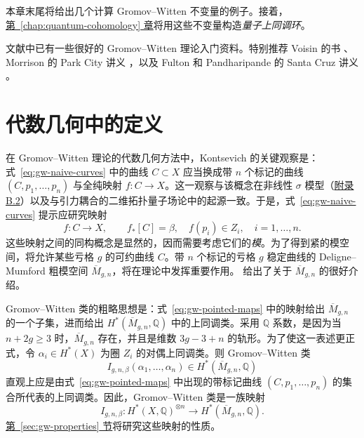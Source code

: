 本章末尾将给出几个计算 Gromov--Witten 不变量的例子。接着，\hyperref[chap:quantum-cohomology]{第~\ref*{chap:quantum-cohomology} 章}将用这些不变量构造\emph{量子上同调环}。

文献中已有一些很好的 Gromov--Witten 理论入门资料。特别推荐 Voisin 的书 、Morrison 的 Park City 讲义 ，以及 Fulton 和 Pandharipande 的 Santa Cruz 讲义 。

\section{代数几何中的定义}\label{sec:gw-algebraic-definition}
在 Gromov--Witten 理论的代数几何方法中，Kontsevich  的关键观察是：式~\eqref{eq:gw-naive-curves} 中的曲线 $C\subset X$ 应当换成带 $n$ 个标记的曲线 $(C,p_1,\ldots,p_n)$ 与全纯映射 $f:C\to X$。这一观察与该概念在非线性 $\sigma$ 模型（\hyperref[sec:nonlinear-sigma-models]{附录 B.2}）以及与引力耦合的二维拓扑量子场论中的起源一致。于是，式~\eqref{eq:gw-naive-curves} 提示应研究映射
\begin{equation}\label{eq:gw-pointed-maps}
f:C\longrightarrow X,\qquad f_*[C]=\beta,\quad
f(p_i)\in Z_i,\quad i=1,\ldots,n.
\end{equation}
这些映射之间的同构概念是显然的，因而需要考虑它们的\emph{模}。为了得到紧的模空间，将允许某些亏格 $g$ 的可约曲线 $C$。带 $n$ 个标记的亏格 $g$ 稳定曲线的 Deligne--Mumford 粗模空间 $\overline M_{g,n}$，将在理论中发挥重要作用。 给出了关于 $\overline M_{g,n}$ 的很好介绍。

Gromov--Witten 类的粗略思想是：式~\eqref{eq:gw-pointed-maps} 中的映射给出 $\overline M_{g,n}$ 的一个子集，进而给出 $H^*(\overline M_{g,n},\mathbb Q)$ 中的上同调类。采用 $\mathbb Q$ 系数，是因为当 $n+2g\geq3$ 时，$\overline M_{g,n}$ 存在，并且是维数 $3g-3+n$ 的轨形。为了使这一表述更正式，令 $\alpha_i\in H^*(X)$ 为圈 $Z_i$ 的对偶上同调类。则 Gromov--Witten 类
\[
I_{g,n,\beta}(\alpha_1,\ldots,\alpha_n)\in H^*(\overline M_{g,n},\mathbb Q)
\]
直观上应是由式~\eqref{eq:gw-pointed-maps} 中出现的带标记曲线 $(C,p_1,\ldots,p_n)$ 的集合所代表的上同调类。因此，Gromov--Witten 类是一族映射
\begin{equation}\label{eq:gw-class-map}
I_{g,n,\beta}:H^*(X,\mathbb Q)^{\otimes n}
\longrightarrow H^*(\overline M_{g,n},\mathbb Q).
\end{equation}
\hyperref[sec:gw-properties]{第~\ref*{sec:gw-properties} 节}将研究这些映射的性质。

